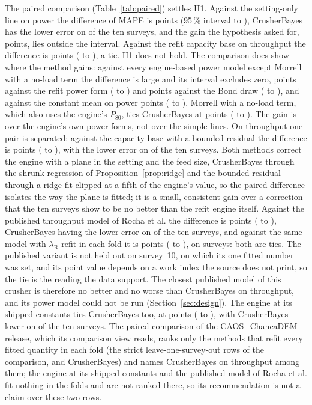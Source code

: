 \documentclass[journal]{IEEEtran}
\newcommand{\pct}{\,\%}
\begin{document}
The paired comparison (Table~\ref{tab:paired}) settles H1. Against the setting-only line on power the difference of MAPE is
\dBlinKw{} points (95\pct{} interval \dBlinKwLo{} to \dBlinKwHi), CrusherBayes has the lower error on \dBlinKwWins{} of the
ten surveys, and the gain the hypothesis asked for, \marginPts{} points, lies outside the interval. Against the refit capacity
base on throughput the difference is \dBackTph{} points (\dBackTphLo{} to \dBackTphHi), a tie. H1 does not hold. The
comparison does show where the method gains: against every engine-based power model except Morrell with a no-load term
the difference is large and its interval excludes zero, \dBackKw{} points against the refit power form (\dBackKwLo{} to
\dBackKwHi) and \dBondKw{} points against the Bond draw (\dBondKwLo{} to \dBondKwHi), and against the constant mean on power
\dConstKw{} points (\dConstKwLo{} to \dConstKwHi). Morrell with a no-load term, which also uses the engine's $P_{80}$, ties
CrusherBayes at \dMnlKw{} points (\dMnlKwLo{} to \dMnlKwHi). The gain is over the engine's own power forms, not over the
simple lines. On throughput one pair is separated: against the capacity base with a bounded residual the difference is
\dResidTph{} points (\dResidTphLo{} to \dResidTphHi), with the lower error on \dResidTphWins{} of the ten surveys. Both methods
correct the engine with a plane in the setting and the feed size, CrusherBayes through the
shrunk regression of Proposition~\ref{prop:ridge} and the bounded residual through a ridge fit clipped at a fifth of the
engine's value, so the paired difference isolates the way the plane is fitted; it is a small, consistent gain over a
correction that the ten surveys show to be no better than the refit engine itself. Against the published throughput model
of Rocha et al. the difference is \dRochaPubTph{} points (\dRochaPubTphLo{} to \dRochaPubTphHi), CrusherBayes having the
lower error on \dRochaPubTphWins{} of the ten surveys, and against the same model with $\lambda_{\mathrm R}$ refit in each
fold it is \dRochaFitTph{} points (\dRochaFitTphLo{} to \dRochaFitTphHi), on \dRochaFitTphWins{} surveys: both are ties. The
published variant is not held out on survey~10, on which its one fitted number was set, and its point value depends on
a work index the source does not print, so the tie is the reading the data support. The closest published model of this
crusher is therefore no better and no worse than CrusherBayes on throughput, and its power model could not be run
(Section~\ref{sec:design}). The engine at its shipped constants ties CrusherBayes too, at \dPubTph{} points (\dPubTphLo{} to
\dPubTphHi), with CrusherBayes lower on \dPubTphWins{} of the ten surveys. The paired comparison of the CAOS\_ChancaDEM release, which its comparison view reads, ranks only the methods that refit
every fitted quantity in each fold (the strict leave-one-survey-out rows of the comparison, and CrusherBayes) and names CrusherBayes on throughput among them; the engine at its shipped constants and the published model of
Rocha et al. fit nothing in the folds and are not ranked there, so its recommendation is not a claim over these two rows.
\end{document}
